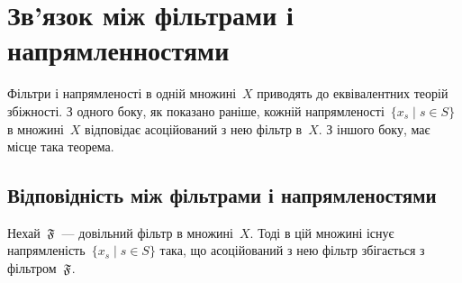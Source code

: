 \chapter{Зв'язок між фільтрами і напрямленностями}

Фільтри і напрямленості в одній множині~$X$ приводять до еквівалентних теорій збіжності. З одного боку, як показано раніше, кожній напрямленості~$\{x_s \mid s \in S\}$ в множині~$X$ відповідає асоційований з нею фільтр в~$X$. З іншого боку, має місце така теорема.

\section{Відповідність між фільтрами і напрямленостями}

\begin{theorem}
    Нехай~$\frak F$~--- довільний фільтр в множині~$X$. Тоді в цій множині існує напрямленість~$\{x_s \mid s \in S\}$ така, що асоційований з нею фільтр збігається з фільтром~$\frak F$.
\end{theorem}

